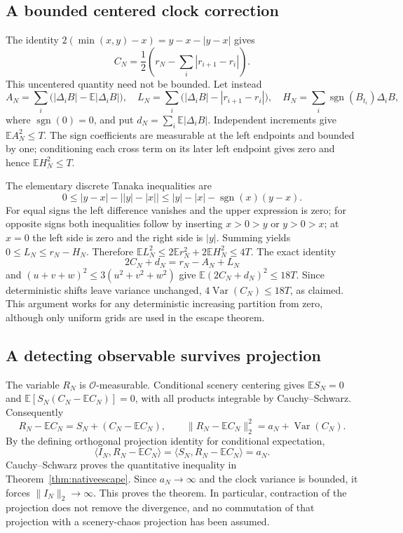 \documentclass[11pt]{article}
\theoremstyle{remark}\newtheorem{remark}[theorem]{Remark}
\begin{document}
\subsection{A bounded centered clock correction}
The identity $2(\min(x,y)-x)=y-x-|y-x|$ gives
\[
 C_N=\frac12\left(r_N-\sum_i|r_{i+1}-r_i|\right).
\]
This uncentered quantity need not be bounded. Let instead
\[
 A_N=\sum_i\bigl(|\Delta_iB|-\mathbb E|\Delta_iB|\bigr),\quad
 L_N=\sum_i\bigl(|\Delta_iB|-|r_{i+1}-r_i|\bigr),\quad
 H_N=\sum_i\operatorname{sgn}(B_{t_i})\Delta_iB,
\]
where $\operatorname{sgn}(0)=0$, and put
$d_N=\sum_i\mathbb E|\Delta_iB|$.
Independent increments give $\mathbb E A_N^2\leq T$.
The sign coefficients are measurable at the left endpoints and bounded
by one; conditioning each cross term on its later left endpoint
gives zero and hence $\mathbb E H_N^2\leq T$.

The elementary discrete Tanaka inequalities are
\[
 0\leq |y-x|-\bigl||y|-|x|\bigr|
 \leq |y|-|x|-\operatorname{sgn}(x)(y-x).
\]
For equal signs the left difference vanishes and the upper expression
is zero; for opposite signs both inequalities follow by inserting
$x>0>y$ or $y>0>x$; at $x=0$ the left side is zero and the right
side is $|y|$. Summing yields $0\leq L_N\leq r_N-H_N$.
Therefore
$\mathbb E L_N^2\leq2\mathbb E r_N^2+2\mathbb E H_N^2\leq4T$.
The exact identity
\[
 2C_N+d_N=r_N-A_N+L_N
\]
and $(u+v+w)^2\leq3(u^2+v^2+w^2)$ give
$\mathbb E(2C_N+d_N)^2\leq18T$.
Since deterministic shifts leave variance unchanged,
$4\operatorname{Var}(C_N)\leq18T$, as claimed.
This argument works for any deterministic increasing partition from
zero, although only uniform grids are used in the escape theorem.

\subsection{A detecting observable survives projection}
The variable $R_N$ is $\mathcal O$-measurable. Conditional scenery
centering gives $\mathbb E S_N=0$ and
$\mathbb E[S_N(C_N-\mathbb E C_N)]=0$, with all products integrable
by Cauchy--Schwarz. Consequently
\[
 R_N-\mathbb E C_N=S_N+(C_N-\mathbb E C_N),\qquad
 \|R_N-\mathbb E C_N\|_2^2=a_N+\operatorname{Var}(C_N).
\]
By the defining orthogonal projection identity for conditional
expectation,
\[
 \langle I_N,R_N-\mathbb E C_N\rangle
 =\langle S_N,R_N-\mathbb E C_N\rangle=a_N.
\]
Cauchy--Schwarz proves the quantitative inequality in
Theorem~\ref{thm:nativeescape}. Since $a_N\to\infty$ and the clock
variance is bounded, it forces $\|I_N\|_2\to\infty$.
This proves the theorem. In particular, contraction of the projection
does not remove the divergence, and no commutation of that projection
with a scenery-chaos projection has been assumed.
\end{document}

